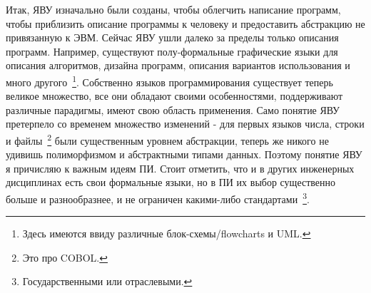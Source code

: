 Итак, ЯВУ изначально были созданы, чтобы облегчить написание программ, чтобы приблизить описание программы к человеку и предоставить абстракцию не привязанную к ЭВМ. Сейчас ЯВУ ушли далеко за пределы только описания программ. Например, существуют полу-формальные графические языки для описания алгоритмов, дизайна программ, описания вариантов использования и много другого~\footnote{Здесь имеются ввиду различные блок-схемы/flowcharts и UML.}. Собственно языков программирования существует теперь великое множество, все они обладают своими особенностями, поддерживают различные парадигмы, имеют свою область применения. Само понятие ЯВУ претерпело со временем множество изменений - для первых языков числа, строки и файлы~\footnote{Это про COBOL.} были существенным уровнем абстракции, теперь же никого не удивишь полиморфизмом и абстрактными типами данных. Поэтому понятие ЯВУ я причисляю к важным идеям ПИ. Стоит отметить, что и в других инженерных дисциплинах есть свои формальные языки, но в ПИ их выбор существенно больше и разнообразнее, и не ограничен какими-либо стандартами~\footnote{Государственными или отраслевыми.}.
